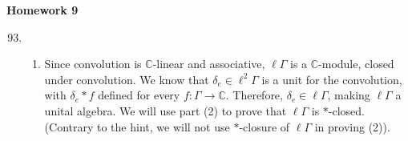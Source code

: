 \documentclass[a4paper,10pt]{report}
\newcommand{\C}{\mathbb{C}}
\begin{document}

\pagestyle{fancy}	
\fancyhf{} %
\setlength{\headheight}{60pt}

\begin{center}
	\textbf{Homework 9}
\end{center}

\begin{enumerate}
		\setcounter{enumi}{92}
	\item 
		\begin{enumerate}
			\item Since convolution is $\C$-linear and associative, $\ell\Gamma$ is a $\C$-module, closed under convolution. We know that $\delta_e\in\ell^2\Gamma$ is a unit for the convolution, with $\delta_e\ast f$ defined for every $f:\Gamma\to\C$. Therefore, $\delta_e\in\ell\Gamma$, making $\ell\Gamma$ a unital algebra. We will use part (2) to prove that $\ell\Gamma$ is $*$-closed. (Contrary to the hint, we will not use $*$-closure of $\ell\Gamma$ in proving (2)). 


\end{enumerate}
\end{enumerate}
\end{document}

